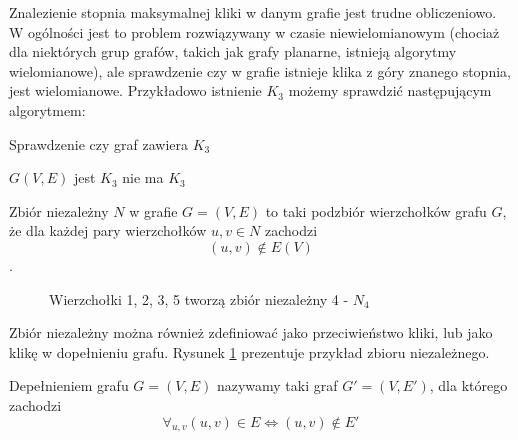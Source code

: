   Znalezienie stopnia maksymalnej kliki w danym grafie jest trudne obliczeniowo.
  W ogólności jest to problem rozwiązywany w czasie niewielomianowym (chociaż dla niektórych grup grafów, 
  takich jak grafy planarne, istnieją algorytmy wielomianowe), ale sprawdzenie czy w grafie istnieje klika
  z góry znanego stopnia, jest wielomianowe. Przykładowo istnienie $K_3$ możemy sprawdzić następującym algorytmem:
  
  
  \begin{algorithm}
    \caption{Sprawdzenie czy graf zawiera $K_3$}
    \begin{algorithmic}
    \REQUIRE $G(V, E) $
          \STATE \RETURN jest $K_3$
        \ENDIF
      \ENDFOR
    \ENDFOR
    \STATE \RETURN nie ma $K_3$
    \end{algorithmic}
  \end{algorithm}
  
  
  \begin{definition}
    Zbiór niezależny $N$ w grafie $G=(V,E)$ to taki podzbiór wierzchołków grafu $G$, że dla każdej pary wierzchołków $u, v \in N$ zachodzi $$(u, v) \notin E(V) $$. 
  \end{definition}

    \begin{figure}[H]
      \centering
        \caption{Wierzchołki 1, 2, 3, 5 tworzą zbiór niezależny 4 - $N_4$ }
        \label{zniez}
     \end{figure}


     Zbiór niezależny można również zdefiniować jako przeciwieństwo kliki, lub jako klikę w dopełnieniu grafu. Rysunek \ref{zniez} prezentuje przykład zbioru niezależnego.

    \begin{definition}
      Depełnieniem grafu $G=(V,E)$ nazywamy taki graf $G'=(V,E')$, 
      dla którego zachodzi 
      $$\forall_{u,v} (u,v) \in E \iff (u,v) \notin E'$$
    \end{definition}
  
